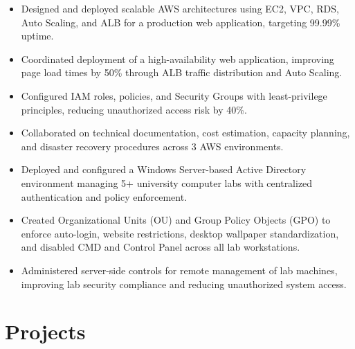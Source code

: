 \documentclass{resume}
\begin{document}
\begin{itemize}
  \item Designed and deployed scalable AWS architectures using EC2, VPC, RDS, Auto Scaling, and ALB for a production web application, targeting 99.99\% uptime.
  \item Coordinated deployment of a high-availability web application, improving page load times by 50\% through ALB traffic distribution and Auto Scaling.
  \item Configured IAM roles, policies, and Security Groups with least-privilege principles, reducing unauthorized access risk by 40\%.
  \item Collaborated on technical documentation, cost estimation, capacity planning, and disaster recovery procedures across 3 AWS environments.
\end{itemize}

\begin{itemize}
  \item Deployed and configured a Windows Server-based Active Directory environment managing 5+ university computer labs with centralized authentication and policy enforcement.
  \item Created Organizational Units (OU) and Group Policy Objects (GPO) to enforce auto-login, website restrictions, desktop wallpaper standardization, and disabled CMD and Control Panel across all lab workstations.
  \item Administered server-side controls for remote management of lab machines, improving lab security compliance and reducing unauthorized system access.
\end{itemize}

\newpage
\section{Projects}
\end{document}

